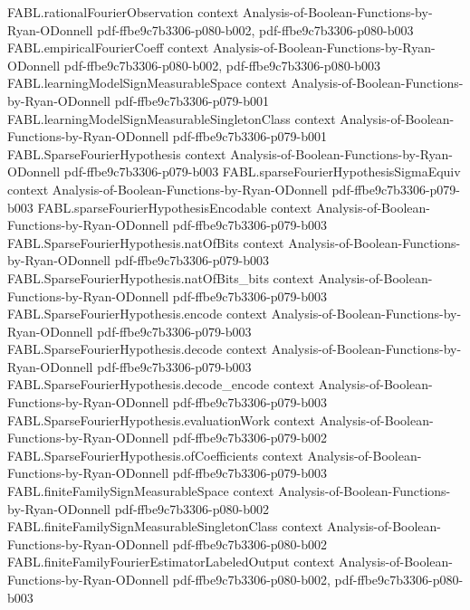 \begin{theorem}
\proofstep
  {FABL.rationalFourierObservation}
  {context}
  {Analysis-of-Boolean-Functions-by-Ryan-ODonnell}
  {pdf-ffbe9c7b3306-p080-b002,
    pdf-ffbe9c7b3306-p080-b003}
\proofstep
  {FABL.empiricalFourierCoeff}
  {context}
  {Analysis-of-Boolean-Functions-by-Ryan-ODonnell}
  {pdf-ffbe9c7b3306-p080-b002,
    pdf-ffbe9c7b3306-p080-b003}
\proofstep
  {FABL.learningModelSignMeasurableSpace}
  {context}
  {Analysis-of-Boolean-Functions-by-Ryan-ODonnell}
  {pdf-ffbe9c7b3306-p079-b001}
\proofstep
  {FABL.learningModelSignMeasurableSingletonClass}
  {context}
  {Analysis-of-Boolean-Functions-by-Ryan-ODonnell}
  {pdf-ffbe9c7b3306-p079-b001}
\proofstep
  {FABL.SparseFourierHypothesis}
  {context}
  {Analysis-of-Boolean-Functions-by-Ryan-ODonnell}
  {pdf-ffbe9c7b3306-p079-b003}
\proofstep
  {FABL.sparseFourierHypothesisSigmaEquiv}
  {context}
  {Analysis-of-Boolean-Functions-by-Ryan-ODonnell}
  {pdf-ffbe9c7b3306-p079-b003}
\proofstep
  {FABL.sparseFourierHypothesisEncodable}
  {context}
  {Analysis-of-Boolean-Functions-by-Ryan-ODonnell}
  {pdf-ffbe9c7b3306-p079-b003}
\proofstep
  {FABL.SparseFourierHypothesis.natOfBits}
  {context}
  {Analysis-of-Boolean-Functions-by-Ryan-ODonnell}
  {pdf-ffbe9c7b3306-p079-b003}
\proofstep
  {FABL.SparseFourierHypothesis.natOfBits_bits}
  {context}
  {Analysis-of-Boolean-Functions-by-Ryan-ODonnell}
  {pdf-ffbe9c7b3306-p079-b003}
\proofstep
  {FABL.SparseFourierHypothesis.encode}
  {context}
  {Analysis-of-Boolean-Functions-by-Ryan-ODonnell}
  {pdf-ffbe9c7b3306-p079-b003}
\proofstep
  {FABL.SparseFourierHypothesis.decode}
  {context}
  {Analysis-of-Boolean-Functions-by-Ryan-ODonnell}
  {pdf-ffbe9c7b3306-p079-b003}
\proofstep
  {FABL.SparseFourierHypothesis.decode_encode}
  {context}
  {Analysis-of-Boolean-Functions-by-Ryan-ODonnell}
  {pdf-ffbe9c7b3306-p079-b003}
\proofstep
  {FABL.SparseFourierHypothesis.evaluationWork}
  {context}
  {Analysis-of-Boolean-Functions-by-Ryan-ODonnell}
  {pdf-ffbe9c7b3306-p079-b002}
\proofstep
  {FABL.SparseFourierHypothesis.ofCoefficients}
  {context}
  {Analysis-of-Boolean-Functions-by-Ryan-ODonnell}
  {pdf-ffbe9c7b3306-p079-b003}
\proofstep
  {FABL.finiteFamilySignMeasurableSpace}
  {context}
  {Analysis-of-Boolean-Functions-by-Ryan-ODonnell}
  {pdf-ffbe9c7b3306-p080-b002}
\proofstep
  {FABL.finiteFamilySignMeasurableSingletonClass}
  {context}
  {Analysis-of-Boolean-Functions-by-Ryan-ODonnell}
  {pdf-ffbe9c7b3306-p080-b002}
\proofstep
  {FABL.finiteFamilyFourierEstimatorLabeledOutput}
  {context}
  {Analysis-of-Boolean-Functions-by-Ryan-ODonnell}
  {pdf-ffbe9c7b3306-p080-b002,
    pdf-ffbe9c7b3306-p080-b003}

\end{theorem}
